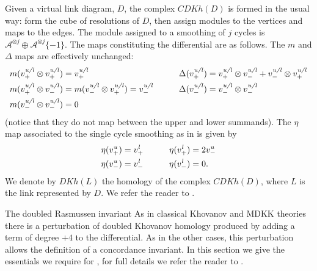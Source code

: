 \documentclass[10pt,oneside]{amsart}
\theoremstyle{definition}
\numberwithin{equation}{section}
\begin{document}
Given a virtual link diagram, \( D \), the complex \( {CDKh} ( D ) \) is formed in the usual way: form the cube of resolutions of \( D \), then assign modules to the vertices and maps to the edges. The module assigned to a smoothing of \( j \) cycles is \( \mathcal{A}^{\otimes j} \oplus  \mathcal{A}^{\otimes j} \lbrace -1 \rbrace \). The maps constituting the differential are as follows. The \(m\) and \( \Delta \) maps are effectively unchanged:
	\begin{equation*}
		\label{Eq:diffcomp}
		\begin{aligned}
			m( v^{\text{\emph{u/l}}}_+ \otimes v^{\text{\emph{u/l}}}_+ ) & = v^{\text{\emph{u/l}}}_+ \qquad &\Delta ( v^{\text{\emph{u/l}}}_+ ) & = v^{\text{\emph{u/l}}}_+ \otimes v^{\text{\emph{u/l}}}_-  + v^{\text{\emph{u/l}}}_- \otimes v^{\text{\emph{u/l}}}_+  \\
			m( v^{\text{\emph{u/l}}}_+ \otimes v^{\text{\emph{u/l}}}_- ) &= m( v^{\text{\emph{u/l}}}_- \otimes v^{\text{\emph{u/l}}}_+ ) = v^{\text{\emph{u/l}}}_- \qquad &\Delta  ( v^{\text{\emph{u/l}}}_- ) & = v^{\text{\emph{u/l}}}_- \otimes v^{\text{\emph{u/l}}}_- \\
			m(v^{\text{\emph{u/l}}}_- \otimes v^{\text{\emph{u/l}}}_- ) & = 0 & & 
		\end{aligned}
	\end{equation*}
(notice that they do not map between the upper and lower summands). The \( \eta \) map associated to the single cycle smoothing as in  is given by
	\begin{equation*}
		\label{Eq:etamap}
		\begin{aligned}
			\eta ( v^{\text{\emph{u}}}_+ ) & = v^{\text{\emph{l}}}_+ \qquad & \eta ( v^{\text{\emph{l}}}_+ ) & = 2 v^{\text{\emph{u}}}_- \\
			\eta ( v^{\text{\emph{u}}}_- ) & = v^{\text{\emph{l}}}_- \qquad & \eta ( v^{\text{\emph{l}}}_- ) & = 0.
		\end{aligned}
	\end{equation*}
We denote by \( {DKh} ( L ) \) the homology of the complex \( {CDKh} ( D ) \), where \( L \) is the link represented by \( D \). We refer the reader to \cite{Rushworth2017}.

{		{\normalfont\bfseries}}{The doubled Rasmussen invariant}
As in classical Khovanov and MDKK theories there is a perturbation of doubled Khovanov homology produced by adding a term of degree \(+4\) to the differential. As in the other cases, this perturbation allows the definition of a concordance invariant. In this section we give the essentials we require for , for full details we refer the reader to \cite[Section \(4\)]{Rushworth2017}.
\end{document}
